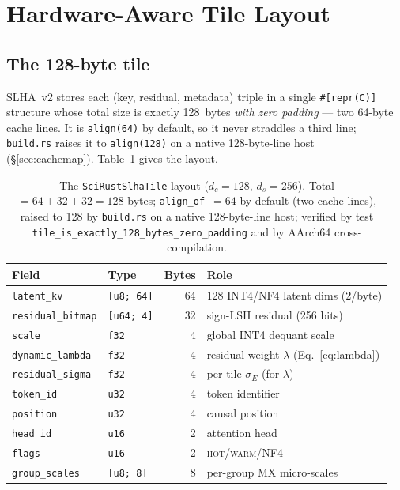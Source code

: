 \documentclass[11pt]{article}
\theoremstyle{plain}
\theoremstyle{definition}
\newcommand{\dc}{d_c}
\newcommand{\ds}{d_s}
\newcommand{\sigE}{\sigma_E}
\begin{document}
\section{Hardware-Aware Tile Layout}
\label{sec:tile}

\subsection{The 128-byte tile}
SLHA~v2 stores each (key, residual, metadata) triple in a single
\texttt{\#[repr(C)]} structure whose total size is exactly 128~bytes
\emph{with zero padding} --- two 64-byte cache lines. It is \texttt{align(64)}
by default, so it never straddles a third line; \texttt{build.rs} raises it to
\texttt{align(128)} on a native 128-byte-line host (\S\ref{sec:cachemap}).
Table~\ref{tab:tile} gives the layout.

\begin{table}[t]
\centering
\caption{The \texttt{SciRustSlhaTile} layout ($\dc=128$, $\ds=256$).
Total $= 64+32+32 = 128$ bytes; \texttt{align\_of}~$=64$ by default (two cache
lines), raised to 128 by \texttt{build.rs} on a native 128-byte-line host;
verified by test \texttt{tile\_is\_exactly\_128\_bytes\_zero\_padding} and by
AArch64 cross-compilation.}
\label{tab:tile}
\small
\begin{tabular}{@{}llr l@{}}
\toprule
Field & Type & Bytes & Role \\
\midrule
\texttt{latent\_kv}       & \texttt{[u8; 64]}  & 64 & 128 INT4/NF4 latent dims (2/byte) \\
\texttt{residual\_bitmap} & \texttt{[u64; 4]}  & 32 & sign-LSH residual (256 bits) \\
\texttt{scale}            & \texttt{f32}       & 4  & global INT4 dequant scale \\
\texttt{dynamic\_lambda}  & \texttt{f32}       & 4  & residual weight $\lambda$ (Eq.~\ref{eq:lambda}) \\
\texttt{residual\_sigma}  & \texttt{f32}       & 4  & per-tile $\sigE$ (for $\lambda$) \\
\texttt{token\_id}        & \texttt{u32}       & 4  & token identifier \\
\texttt{position}         & \texttt{u32}       & 4  & causal position \\
\texttt{head\_id}         & \texttt{u16}       & 2  & attention head \\
\texttt{flags}            & \texttt{u16}       & 2  & \textsc{hot}/\textsc{warm}/NF4 \\
\texttt{group\_scales}    & \texttt{[u8; 8]}   & 8  & per-group MX micro-scales \\
\bottomrule
\end{tabular}
\end{table}
\end{document}
